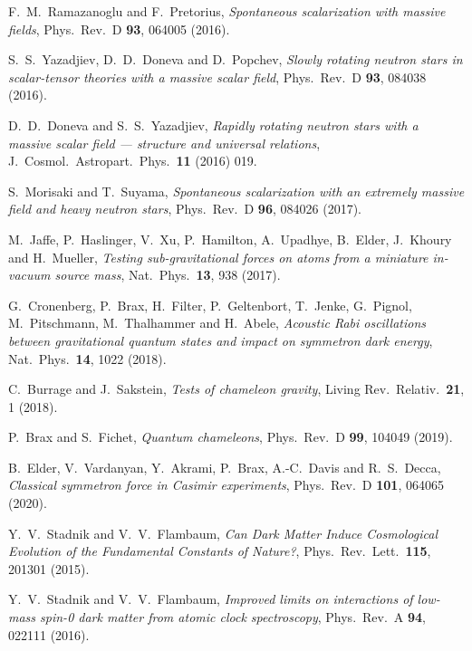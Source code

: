 \documentclass[aps,prd,onecolumn,nofootinbib]{revtex4-2} %
\begin{document}
\begin{thebibliography}{99}
 F.~M.~Ramazanoglu and F.~Pretorius, \textit{Spontaneous scalarization with massive fields}, Phys.~Rev.~D \textbf{93}, 064005 (2016). 

 S.~S.~Yazadjiev, D.~D.~Doneva and D.~Popchev, \textit{Slowly rotating neutron stars in scalar-tensor theories with a massive scalar field}, Phys.~Rev.~D \textbf{93}, 084038 (2016). 

 D.~D.~Doneva and S.~S.~Yazadjiev, \textit{Rapidly rotating neutron stars with a massive scalar field --- structure and universal relations}, J.~Cosmol.~Astropart.~Phys.~\textbf{11} (2016) 019. 

 S.~Morisaki and T.~Suyama, \textit{Spontaneous scalarization with an extremely massive field and heavy neutron stars}, Phys.~Rev.~D \textbf{96}, 084026 (2017). 


 M.~Jaffe, P.~Haslinger, V.~Xu, P.~Hamilton, A.~Upadhye, B.~Elder, J.~Khoury and H.~Mueller, \textit{Testing sub-gravitational forces on atoms from a miniature in-vacuum source mass}, Nat.~Phys.~\textbf{13}, 938 (2017). 

 G.~Cronenberg, P.~Brax, H.~Filter, P.~Geltenbort, T.~Jenke, G.~Pignol, M.~Pitschmann, M.~Thalhammer and H.~Abele, \textit{Acoustic Rabi oscillations between gravitational quantum states and impact on symmetron dark energy}, Nat.~Phys.~\textbf{14}, 1022 (2018). 

 C.~Burrage and J.~Sakstein, \textit{Tests of chameleon gravity}, Living Rev.~Relativ.~\textbf{21}, 1 (2018). 

 P.~Brax and S.~Fichet, \textit{Quantum chameleons}, Phys.~Rev.~D \textbf{99}, 104049 (2019). 

 B.~Elder, V.~Vardanyan, Y.~Akrami, P.~Brax, A.-C.~Davis and R.~S.~Decca, \textit{Classical symmetron force in Casimir experiments}, Phys.~Rev.~D \textbf{101}, 064065 (2020). 


 Y.~V.~Stadnik and V.~V.~Flambaum, \textit{Can Dark Matter Induce Cosmological Evolution of the Fundamental Constants of Nature?}, Phys.~Rev.~Lett.~\textbf{115}, 201301 (2015). 

 Y.~V.~Stadnik and V.~V.~Flambaum, \textit{Improved limits on interactions of low-mass spin-0 dark matter from atomic clock spectroscopy}, Phys.~Rev.~A \textbf{94}, 022111 (2016). 


\end{thebibliography}
\end{document}
